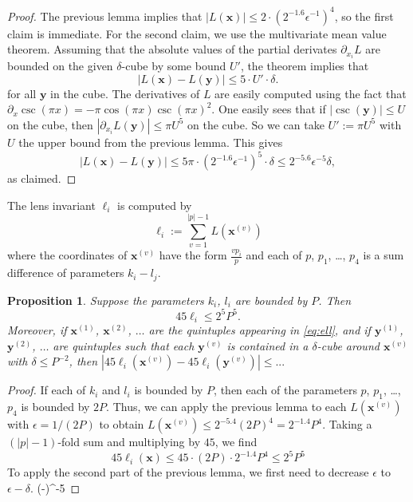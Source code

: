 \documentclass{article}
\newtheorem{prop}[thm]{Proposition}
\newcommand{\abs}[1]{\left|#1\right|}
\renewcommand{\vec}[1]{\mathbf{#1}}
\begin{document}
\begin{proof}
  The previous lemma implies that \(\abs{L(\vec x)} \leq 2\cdot (2^{-1.6}\epsilon^{-1})^4\), so the first claim is immediate. For the second claim, we use the multivariate mean value theorem.  Assuming that the absolute values of the partial derivates \(\partial_{x_i} L\) are bounded on the given \(\delta\)-cube by some bound \(U'\), the theorem implies that 
  \[
    \abs{L(\vec x)-L(\vec y)} \leq 5·U'·\delta.
  \]
  for all \(\vec y\) in the cube.  The derivatives of \(L\) are easily computed using the fact that \(\partial_x \csc(\pi x)  = -\pi \cos(\pi x) \csc(\pi x)^2\).  One easily sees that if \(\abs{\csc(\vec y)}\leq U\) on the cube, then \(\abs{\partial_{x_i} L(\vec y)} \leq \pi U^5\) on the cube.  So we can take \(U' := \pi U^5\) with \(U\) the upper bound from the previous lemma.  This gives
  \[
    \abs{L(\vec x)-L(\vec y)} 
    \leq 5\pi·(2^{-1.6}\epsilon^{-1})^5·\delta 
    \leq 2^{-5.6}\epsilon^{-5}\delta,
  \]
  as claimed.
\end{proof}

The lens invariant \(\ell_i\) is computed by 
\begin{equation}\label{eq:ell}
  \ell_i := \sum_{v=1}^{\abs{p}-1} L(\vec x^{(v)})
\end{equation}
where the coordinates of \(\vec x^{(v)}\) have the form \(\frac{v p_i}{p}\) and each of \(p\), \(p_1\), \dots, \(p_4\) is a sum difference of parameters \(k_i-l_j\).

\begin{prop}
  Suppose the parameters \(k_i\), \(l_i\) are bounded by \(P\).  
  Then
  \[
    45\ell_i \leq 2^5 P^5.
  \]
  Moreover, if \(\vec x^{(1)}\), \(\vec x^{(2)}\), \(\dots\) are the quintuples appearing in \eqref{eq:ell},  and if \(\vec y^{(1)}\), \(\vec y^{(2)}\), \(\dots\) are quintuples such that each \(\vec y^{(v)}\) is contained in a \(\delta\)-cube around \(\vec x^{(v)}\) with \(\delta \leq P^{-2}\), then
  \(
  \abs{45\ell_i(\vec x^{(v)}) - 45\ell_i(\vec y^{(v)})} \leq ...
  \)
\end{prop}
\begin{proof}
  If each of \(k_i\) and \(l_i\) is bounded by \(P\), then each of the parameters \(p\), \(p_1\), \dots, \(p_4\) is bounded by \(2P\).   Thus, we can apply the previous lemma to each \(L(\vec x^{(v)})\) with \(\epsilon = 1/(2P)\) to obtain \(L(\vec x^{(v)}) \leq 2^{-5.4}(2P)^4 = 2^{-1.4}P^4\).
  Taking a \((\abs{p}-1)\)-fold sum and multiplying by \(45\), we find
  \[
    45\ell_i(\vec x) 
    \leq 45·(2P)·2^{-1.4} P^4
    \leq 2^5 P^5
  \]
  To apply the second part of the previous lemma, we first need to decrease \(\epsilon\) to \(\epsilon-\delta\).
  (\epsilon-\delta)^{-5} 


\end{proof}
\end{document}
